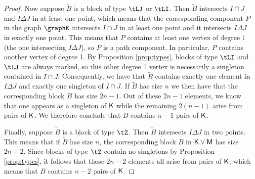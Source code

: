 \documentclass[11pt, a4paper, oneside, reqno]{amsart}
\newcommand{\sK}{{\sf K}}
\newcommand{\sM}{{\sf M}}
\theoremstyle{remark}
\theoremstyle{definition}
\numberwithin{equation}{section}
\begin{document}
\begin{proof}
	Now suppose $\tilde{B}$ is a block of type $\tLJ$ or $\tLI$. Then $\tilde{B}$ intersects $I\cap J$ and $I \Delta J$ in at least one point, which means that the corresponding component $P$ in the graph $\graphK$ intersects $I\cap J$ in at least one point and it intersects $I \Delta J$ in exactly one point. This means that $P$ contains at least one vertex of degree $1$ (the one intersecting $I\Delta J$), so $P$ is a path component. In particular, $P$ contains another vertex of degree 1. By Proposition \ref{prop:types}, blocks of type $\tLI$ and $\tLJ$ are always marked, so this other degree 1 vertex is necessarily a singleton contained in $I\cap J$. Consequently, we have that $\tilde{B}$ contains exactly one element in $I\Delta J$ and exactly one singleton of $I \cap J$. If $\tilde{B}$ has size $n$ we then have that the corresponding block $B$ has size $2n-1$. Out of these $2n-1$ elements, we know that one appears as a singleton of $\sK$ while the remaining $2(n-1)$ arise from pairs of $\sK$. We therefore conclude that $B$ contains $n-1$ pairs of $\sK$.
	
	Finally, suppose $\tilde{B}$ is a block of type $\tZ$. Then $\tilde{B}$ intersects $I\Delta J$ in two points. This means that if $\tilde{B}$ has size $n$, the corresponding block $B$ in $\sK \vee \sM$ has size $2n-2$. Since blocks of type $\tZ$ contain no singletons by Proposition \ref{prop:types}, it follows that those $2n-2$ elements all arise from pairs of $\sK$, which means that $B$ contains $n-2$ pairs of $\sK$.
\end{proof}
\end{document}
